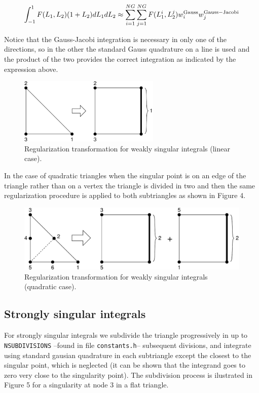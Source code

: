 \documentclass[12pt]{article}
\begin{document}
\begin{equation}
\int_{-1}^1{F(L_1,L_2)(1+L_2)dL_1dL_2} \approx \sum_{i=1}^{NG}{\sum_{j=1}^{NG}{F(L_1^i,L_2^j)w_i^{\rm Gauss}w_j^{\rm Gauss-Jacobi}}}
\end{equation}

Notice that the Gauss-Jacobi integration is necessary in only one of the directions, so in the other the standard Gauss quadrature on a line is used and the product of the two provides the correct integration as indicated by the expression above.

\begin{figure}[!hbt]
\begin{center}
\includegraphics[width=0.6\textwidth, viewport = 0 0 402 188]{weakly_singular.pdf}
\caption{Regularization transformation for weakly singular integrals (linear case).}
\end{center}
\end{figure}

In the case of quadratic triangles when the singular point is on an edge of the triangle rather than on a vertex the triangle is divided in two and then the same regularization procedure is applied to both subtriangles as shown in Figure 4.

\begin{figure}[!hbt]
\begin{center}
\includegraphics[width=\textwidth]{weakly_singular_t6.pdf}
\caption{Regularization transformation for weakly singular integrals (quadratic case).}
\end{center}
\end{figure}

\subsection*{Strongly singular integrals}
For strongly singular integrals we subdivide the triangle progressively in up to \verb+NSUBDIVISIONS+ --found in file \verb+constants.h+-- subsequent divisions, and integrate using standard gausian quadrature in each subtriangle except the closest to the singular point, which is neglected (it can be shown that the integrand goes to zero very close to the singularity point). The subdivision process is ilustrated in Figure 5 for a singularity at node 3 in a flat triangle.
\end{document}
